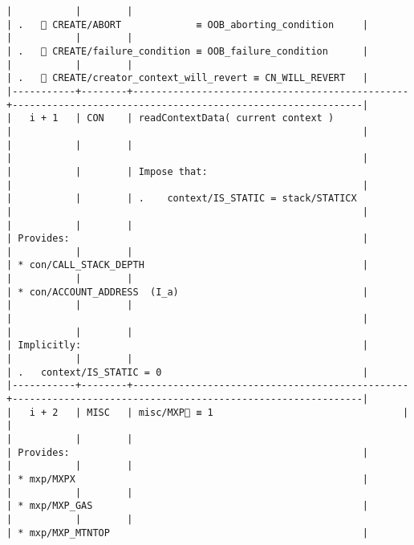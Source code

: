 \documentclass[varwidth=\maxdimen,margin=0.5cm,multi={verbatim}]{standalone}
\begin{document}
\begin{verbatim}
|           |        |                                                | .    CREATE/ABORT             ≡ OOB_aborting_condition     |
|           |        |                                                | .    CREATE/failure_condition ≡ OOB_failure_condition      |
|           |        |                                                | .    CREATE/creator_context_will_revert ≡ CN_WILL_REVERT   |
|-----------+--------+------------------------------------------------+-------------------------------------------------------------|
|   i + 1   | CON    | readContextData( current context )             |                                                             |
|           |        |                                                |                                                             |
|           |        | Impose that:                                   |                                                             |
|           |        | .    context/IS_STATIC = stack/STATICX         |                                                             |
|           |        |                                                | Provides:                                                   |
|           |        |                                                | * con/CALL_STACK_DEPTH                                      |
|           |        |                                                | * con/ACCOUNT_ADDRESS  (I_a)                                |
|           |        |                                                |                                                             |
|           |        |                                                | Implicitly:                                                 |
|           |        |                                                | .   context/IS_STATIC = 0                                   |
|-----------+--------+------------------------------------------------+-------------------------------------------------------------|
|   i + 2   | MISC   | misc/MXP🚩 ≡ 1                                 |                                                             |
|           |        |                                                | Provides:                                                   |
|           |        |                                                | * mxp/MXPX                                                  |
|           |        |                                                | * mxp/MXP_GAS                                               |
|           |        |                                                | * mxp/MXP_MTNTOP                                            |

\end{verbatim}
\end{document}

